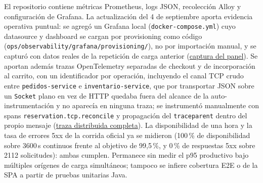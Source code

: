 \documentclass[12pt,a4paper]{article}
\begin{document}
El repositorio contiene métricas Prometheus, logs JSON, recolección Alloy y configuración de Grafana. La actualización del 4 de septiembre aporta evidencia operativa puntual: se agregó un Grafana local (\texttt{docker-compose.yml}) cuyo datasource y dashboard se cargan por provisioning como código (\texttt{ops/observability/grafana/provisioning/}), no por importación manual, y se capturó con datos reales de la repetición de carga anterior (\href{https://github.com/JoseLozanoMorales/TiendaTech/blob/b690470163513c757dd51cb8d47677d09955fda8/docs/evidencias/paso10-item5-grafana-carga.md}{captura del panel}). Se aportan además trazas OpenTelemetry separadas de checkout y de incorporación al carrito, con un identificador por operación, incluyendo el canal TCP crudo entre \texttt{pedidos-service} e \texttt{inventario-service}, que por transportar JSON sobre un \texttt{Socket} plano en vez de HTTP quedaba fuera del alcance de la auto-instrumentación y no aparecía en ninguna traza; se instrumentó manualmente con spans \texttt{reservation.tcp.reconcile} y propagación del \texttt{traceparent} dentro del propio mensaje (\href{https://github.com/JoseLozanoMorales/TiendaTech/blob/b690470163513c757dd51cb8d47677d09955fda8/docs/evidencias/paso10-item6-trace-distribuida.md}{traza distribuida completa}). La disponibilidad de una hora y la tasa de errores 5xx de la corrida oficial ya se midieron (100\,\% de disponibilidad sobre 3600\,s continuos frente al objetivo de 99,5\,\%, y 0\,\% de respuestas 5xx sobre 2112 solicitudes): ambas cumplen. Permanece sin medir el p95 productivo bajo múltiples orígenes de carga simultáneos; tampoco se infiere cobertura E2E o de la SPA a partir de pruebas unitarias Java.
\end{document}
